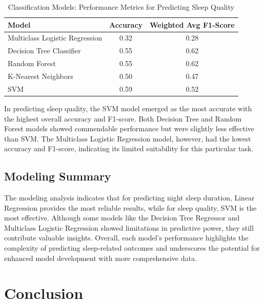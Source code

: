 \documentclass[conference]{IEEEtran}
\begin{document}
\begin{table}[ht]
    \centering
    \caption{Classification Models: Performance Metrics for Predicting Sleep Quality}
    \label{tab:classification-models}
    \begin{tabular}{|l|c|c|}
        \hline
        \textbf{Model}                 & \textbf{Accuracy} & \textbf{Weighted Avg F1-Score} \\
        \hline
        Multiclass Logistic Regression & 0.32              & 0.28                           \\
        Decision Tree Classifier       & 0.55              & 0.62                           \\
        Random Forest                  & 0.55              & 0.62                           \\
        K-Nearest Neighbors            & 0.50              & 0.47                           \\
        SVM                            & 0.59              & 0.52                           \\
        \hline
    \end{tabular}
\end{table}

In predicting sleep quality, the SVM model emerged as the most accurate with the highest overall accuracy and F1-score. Both Decision Tree and Random Forest models showed commendable performance but were slightly less effective than SVM. The Multiclass Logistic Regression model, however, had the lowest accuracy and F1-score, indicating its limited suitability for this particular task.

\subsection*{Modeling Summary}
The modeling analysis indicates that for predicting night sleep duration, Linear Regression provides the most reliable results, while for sleep quality, SVM is the most effective. Although some models like the Decision Tree Regressor and Multiclass Logistic Regression showed limitations in predictive power, they still contribute valuable insights. Overall, each model's performance highlights the complexity of predicting sleep-related outcomes and underscores the potential for enhanced model development with more comprehensive data.

\section{Conclusion}
\end{document}
